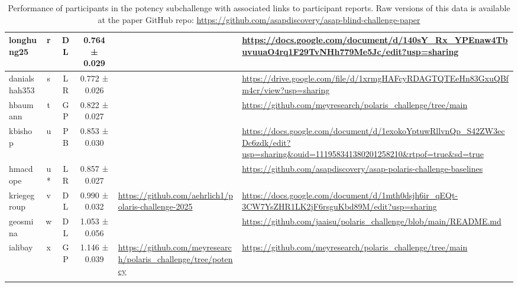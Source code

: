 \documentclass[journal=jcim,manuscript=suppinfo]{achemso}
\begin{document}
{\begin{longtable}{|p{2cm}|c|c|c|p{4cm}|p{6cm}|}
longhung25 & r & DL & 0.764 ± 0.029 & & \url{https://docs.google.com/document/d/140sY_Rx_YPEnaw4TbuvuuaO4rq1F29TvNHh779Me5Jc/edit?usp=sharing} \\
\hline

danialshah353 & s & LR & 0.772 ± 0.026 & & \url{https://drive.google.com/file/d/1xrmgHAFcyRDAGTQTEeHn83GxuQBfm4cr/view?usp=sharing} \\
\hline

hbaumann & t & GP & 0.822 ± 0.027 & & \url{https://github.com/meyresearch/polaris_challenge/tree/main} \\
\hline

kbishop & u & PB & 0.853 ± 0.030 & & \url{https://docs.google.com/document/d/1exokoYptuwRllvnQp_S42ZW3ecDc6zdk/edit?usp=sharing&ouid=111958341380201258210&rtpof=true&sd=true} \\
\hline

hmacdope & u* & LR & 0.857 ± 0.027 & & \url{https://github.com/asapdiscovery/asap-polaris-challenge-baselines} \\
\hline

kriegegroup & v & DL & 0.990 ± 0.032 & \url{https://github.com/aehrlich1/polaris-challenge-2025} & \url{https://docs.google.com/document/d/1mth0dsjh6ir_qEQt-3CW7YsZHR1LK2jF6rsguKbd89M/edit?usp=sharing} \\
\hline

geosmina & w & DL & 1.053 ± 0.056 & & \url{https://github.com/jaaisu/polaris_challenge/blob/main/README.md} \\
\hline

ialibay & x & GP & 1.146 ± 0.039 & \url{https://github.com/meyresearch/polaris_challenge/tree/potency} & \url{https://github.com/meyresearch/polaris_challenge/tree/main} \\
\hline


\caption{Performance of participants in the potency subchallenge with associated links to participant reports. Raw versions of this data is available at the paper GitHub repo: \url{https://github.com/asapdiscovery/asap-blind-challenge-paper}}
\label{tab:admet_results}
\end{longtable}
}


\newpage
\end{document}
